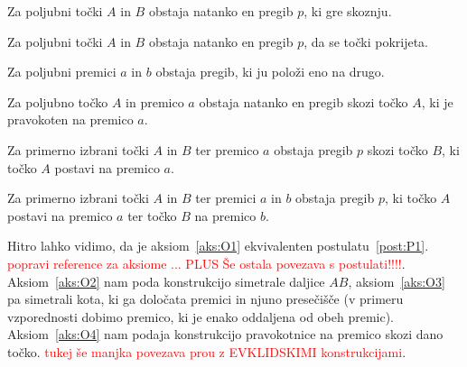 \begin{aksiom}
    \label{aks:O1}
    Za poljubni točki $A$ in $B$ obstaja natanko en pregib $p$, ki gre skoznju.
\end{aksiom}
\begin{aksiom}
    \label{aks:O2}
    Za poljubni točki $A$ in $B$ obstaja natanko en pregib $p$, da se točki pokrijeta.
\end{aksiom}
\begin{aksiom}
    \label{aks:O3}
    Za poljubni premici $a$ in $b$ obstaja pregib, ki ju položi eno na drugo.
\end{aksiom}
\begin{aksiom}
    \label{aks:O4}
    Za poljubno točko $A$ in premico $a$ obstaja natanko en pregib skozi točko $A$, ki je pravokoten na premico $a$.
\end{aksiom}
\begin{aksiom}
    \label{aks:O5}
    Za primerno izbrani točki $A$ in $B$ ter premico $a$ obstaja pregib $p$ skozi točko $B$, ki točko $A$ postavi na premico $a$.
\end{aksiom}
\begin{aksiom}
    \label{aks:O6}
    Za primerno izbrani točki $A$ in $B$ ter premici $a$ in $b$ obstaja pregib $p$, ki točko $A$ postavi na premico $a$ ter točko $B$ na premico $b$.
\end{aksiom}
\begin{aksiom}
    \label{aks:O7}

\end{aksiom}

Hitro lahko vidimo, da je aksiom~\ref{aks:O1} ekvivalenten postulatu~\ref{post:P1}. \textcolor{red}{popravi reference za aksiome ... PLUS Še ostala povezava s postulati!!!!}. Aksiom~\ref{aks:O2} nam poda konstrukcijo simetrale daljice $AB$, aksiom~\ref{aks:O3} pa simetrali kota, ki ga določata premici in njuno presečišče (v primeru vzporednosti dobimo premico, ki je enako oddaljena od obeh premic). Aksiom~\ref{aks:O4} nam podaja konstrukcijo pravokotnice na premico skozi dano točko. \textcolor{red}{tukej še manjka povezava prou z EVKLIDSKIMI konstrukcijami}.
